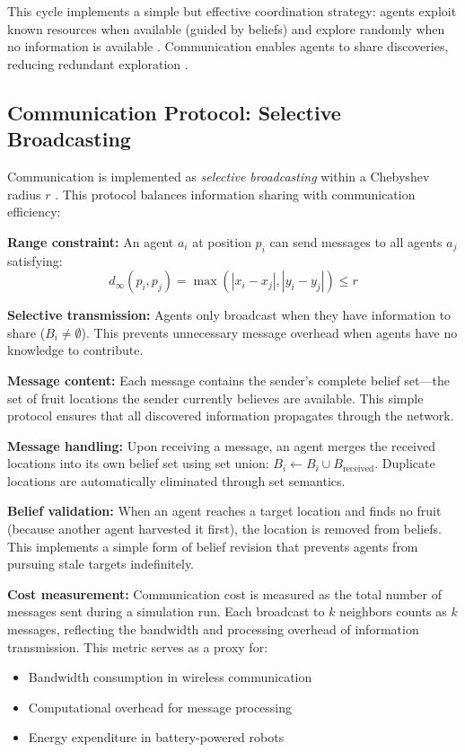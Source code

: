 This cycle implements a simple but effective coordination strategy: agents exploit known resources when available (guided by beliefs) and explore randomly when no information is available \citep{march1991exploration}. Communication enables agents to share discoveries, reducing redundant exploration \citep{panait2005cooperative}.

\subsection{Communication Protocol: Selective Broadcasting}

Communication is implemented as \emph{selective broadcasting} within a Chebyshev radius $r$ \citep{farinelli2004multirobot}. This protocol balances information sharing with communication efficiency:

\textbf{Range constraint:} An agent $a_i$ at position $p_i$ can send messages to all agents $a_j$ satisfying:
\begin{equation}
d_{\infty}(p_i, p_j) = \max(|x_i - x_j|, |y_i - y_j|) \le r
\end{equation}

\textbf{Selective transmission:} Agents only broadcast when they have information to share ($B_i \neq \emptyset$). This prevents unnecessary message overhead when agents have no knowledge to contribute.

\textbf{Message content:} Each message contains the sender's complete belief set—the set of fruit locations the sender currently believes are available. This simple protocol ensures that all discovered information propagates through the network.

\textbf{Message handling:} Upon receiving a message, an agent merges the received locations into its own belief set using set union: $B_i \leftarrow B_i \cup B_{\text{received}}$. Duplicate locations are automatically eliminated through set semantics.

\textbf{Belief validation:} When an agent reaches a target location and finds no fruit (because another agent harvested it first), the location is removed from beliefs. This implements a simple form of belief revision that prevents agents from pursuing stale targets indefinitely.

\textbf{Cost measurement:} Communication cost is measured as the total number of messages sent during a simulation run. Each broadcast to $k$ neighbors counts as $k$ messages, reflecting the bandwidth and processing overhead of information transmission. This metric serves as a proxy for:
\begin{itemize}
    \item Bandwidth consumption in wireless communication
    \item Computational overhead for message processing
    \item Energy expenditure in battery-powered robots
\end{itemize}

